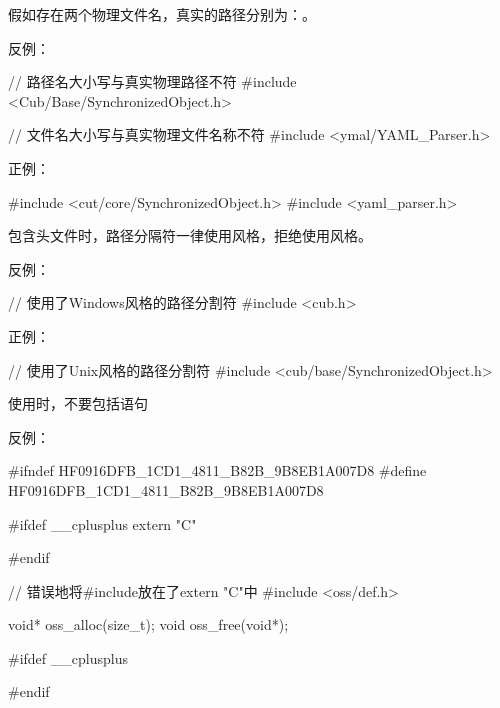 \begin{content}
假如存在两个物理文件名，真实的路径分别为：。

反例：
\begin{leftbar}
\begin{c++}
// 路径名大小写与真实物理路径不符
#include <Cub/Base/SynchronizedObject.h>

// 文件名大小写与真实物理文件名称不符
#include <ymal/YAML_Parser.h>
\end{c++}
\end{leftbar}

正例：
\begin{leftbar}
\begin{c++}
#include <cut/core/SynchronizedObject.h>
#include <yaml_parser.h>
\end{c++}
\end{leftbar}

\begin{regulation}
包含头文件时，路径分隔符一律使用风格，拒绝使用风格。
\end{regulation}

反例：
\begin{leftbar}
\begin{c++}
// 使用了Windows风格的路径分割符
#include <cub\base\SynchronizedObject.h>
\end{c++}
\end{leftbar}

正例：
\begin{leftbar}
\begin{c++}
// 使用了Unix风格的路径分割符
#include <cub/base/SynchronizedObject.h>
\end{c++}
\end{leftbar}

\begin{regulation}
使用时，不要包括语句
\end{regulation}

反例：
\begin{leftbar}
\begin{c++}[caption={\ttfamily{oss/oss\_memery.h}}]
#ifndef HF0916DFB_1CD1_4811_B82B_9B8EB1A007D8
#define HF0916DFB_1CD1_4811_B82B_9B8EB1A007D8
    
#ifdef  __cplusplus
extern "C" {
#endif

// 错误地将\#include放在了extern "C"中
#include <oss/def.h>

void* oss_alloc(size_t);
void  oss_free(void*);

#ifdef  __cplusplus
}
#endif


\end{c++}
\end{leftbar}
\end{content}
